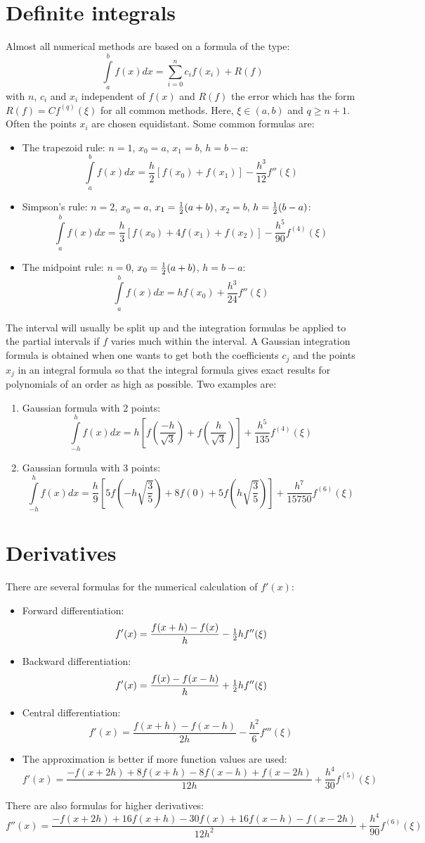 \documentclass[twoside]{report}
\begin{document}
\section{Definite integrals}
Almost all numerical methods are based on a formula of the type:
\[
\int\limits_a^bf(x)dx=\sum_{i=0}^nc_if(x_i)+R(f)
\]
with $n$, $c_i$ and $x_i$ independent of $f(x)$ and $R(f)$ the error which
has the form $R(f)=Cf^{(q)}(\xi)$ for all common methods. Here, $\xi\in(a,b)$
and $q\geq n+1$. Often the points $x_i$ are chosen equidistant.
Some common formulas are:
\begin{itemize}
\item The trapezoid rule: $n=1$, $x_0=a$, $x_1=b$, $h=b-a$:
\[
\int\limits_a^bf(x)dx=\frac{h}{2}[f(x_0)+f(x_1)]-\frac{h^3}{12}f''(\xi)
\]
\item Simpson's rule: $n=2$, $x_0=a$, $x_1=\mbox{$\frac{1}{2}$}(a+b)$, $x_2=b$, $h=\mbox{$\frac{1}{2}$}(b-a)$:
\[
\int\limits_a^bf(x)dx=\frac{h}{3}[f(x_0)+4f(x_1)+f(x_2)]-\frac{h^5}{90}f^{(4)}(\xi)
\]
\item The midpoint rule: $n=0$, $x_0=\mbox{$\frac{1}{2}$}(a+b)$, $h=b-a$:
\[
\int\limits_a^bf(x)dx=hf(x_0)+\frac{h^3}{24}f''(\xi)
\]
\end{itemize}
The interval will usually be split up and the integration formulas be
applied to the partial intervals if $f$ varies much within the interval.
\npar
A Gaussian integration formula is obtained when one wants to get both the
coefficients $c_j$ and the points $x_j$ in an integral formula so that the
integral formula gives exact results for polynomials of an order as high as
possible. Two examples are:
\begin{enumerate}
\item Gaussian formula with 2 points:
\[
\int\limits_{-h}^hf(x)dx=h\left[f\left(\frac{-h}{\sqrt{3}}\right)+f\left(\frac{h}{\sqrt{3}}\right)\right]+\frac{h^5}{135}f^{(4)}(\xi)
\]
\item Gaussian formula with 3 points:
\[
\int\limits_{-h}^hf(x)dx=\frac{h}{9}\left[5f\left(-h\sqrt{\mbox{$\frac{3}{5}$}}\right)+8f(0)+5f\left(h\sqrt{\mbox{$\frac{3}{5}$}}\right)\right]+\frac{h^7}{15750}f^{(6)}(\xi)
\]
\end{enumerate}

\section{Derivatives}
There are several formulas for the numerical calculation of $f'(x)$:
\begin{itemize}
\item Forward differentiation:
\[
f'(x)=\frac{f(x+h)-f(x)}{h}-\mbox{$\frac{1}{2}$} hf''(\xi)
\]
\item Backward differentiation:
\[
f'(x)=\frac{f(x)-f(x-h)}{h}+\mbox{$\frac{1}{2}$} hf''(\xi)
\]
\item Central differentiation:
\[
f'(x)=\frac{f(x+h)-f(x-h)}{2h}-\frac{h^2}{6}f'''(\xi)
\]
\item The approximation is better if more function values are used:
\[
f'(x)=\frac{-f(x+2h)+8f(x+h)-8f(x-h)+f(x-2h)}{12h}+\frac{h^4}{30}f^{(5)}(\xi)
\]
\end{itemize}
There are also formulas for higher derivatives:
\[
f''(x)=\frac{-f(x+2h)+16f(x+h)-30f(x)+16f(x-h)-f(x-2h)}{12h^2}+\frac{h^4}{90}f^{(6)}(\xi)
\]
\end{document}

